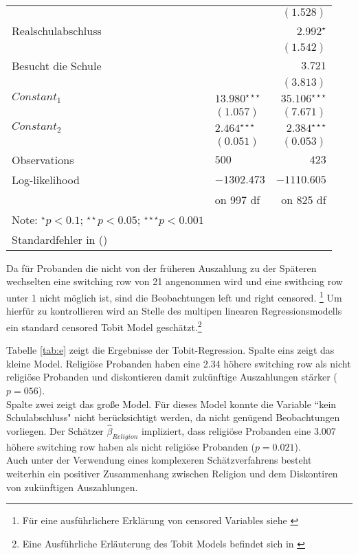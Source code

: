 \documentclass[11pt,a4paper]{article}
\begin{document}
\begin{table}[!htbp]
{\begin{tabular}{llr}
 & &$(1.528)$\\
 Realschulabschluss & &$2.992^\star$\\
 & &$(1.542)$\\
 Besucht die Schule& &$3.721$\\
 & &$(3.813)$\\
 $Constant_1$ &$13.980^{\star\star\star}$ &$35.106^{\star\star\star}$\\
 &$(1.057)$ & $(7.671)$\\
 $Constant_2$ &$2.464^{\star\star\star}$ &$2.384^{\star\star\star}$\\
 &$(0.051)$ &$(0.053)$\\
\hline
Observations&$500$&$423$\\
Log-likelihood & $-1302.473$ & $-1110.605$\\
&on 997 df &on 825 df\\
\midrule
Note:  $^\star p<0.1$;  $^{\star\star} p<0.05$;  $ ^{\star\star\star} p<0.001$ \\
Standardfehler in ()\\
\bottomrule
\end{tabular}}
\end{table}
 
Da für Probanden die nicht von der früheren Auszahlung zu der Späteren wechselten eine switching row von 21 angenommen wird und eine swithcing row unter 1 nicht möglich ist, sind die Beobachtungen left und right censored. \footnote{Für eine ausführlichere Erklärung von censored Variables siehe \textcite{wooldridge2010econometric}} 
Um hierfür zu kontrollieren wird an Stelle des multipen linearen Regressionsmodells ein standard censored Tobit Model geschätzt.\footnote{Eine Ausführliche Erläuterung des Tobit Models befindet sich in \textcite{wooldridge2010econometric}}
 
Tabelle \ref{tab:e} zeigt die Ergebnisse der Tobit-Regression. Spalte eins zeigt das kleine Model. Religiöse Probanden haben eine 2.34 höhere switching row  als nicht religiöse Probanden und diskontieren damit zukünftige Auszahlungen stärker ($p = 056$).\\
Spalte zwei zeigt das große Model. Für dieses Model konnte die Variable “kein Schulabschluss" nicht berücksichtigt werden, da nicht genügend Beobachtungen vorliegen. Der Schätzer $\hat{\beta}_{Religion}$ impliziert, dass religiöse Probanden eine 3.007 höhere switching row haben als nicht religiöse Probanden ($p = 0.021$).\\

Auch unter der Verwendung eines komplexeren Schätzverfahrens besteht weiterhin ein positiver Zusammenhang zwischen Religion und dem Diskontiren von zukünftigen Auszahlungen. 
\end{document}
